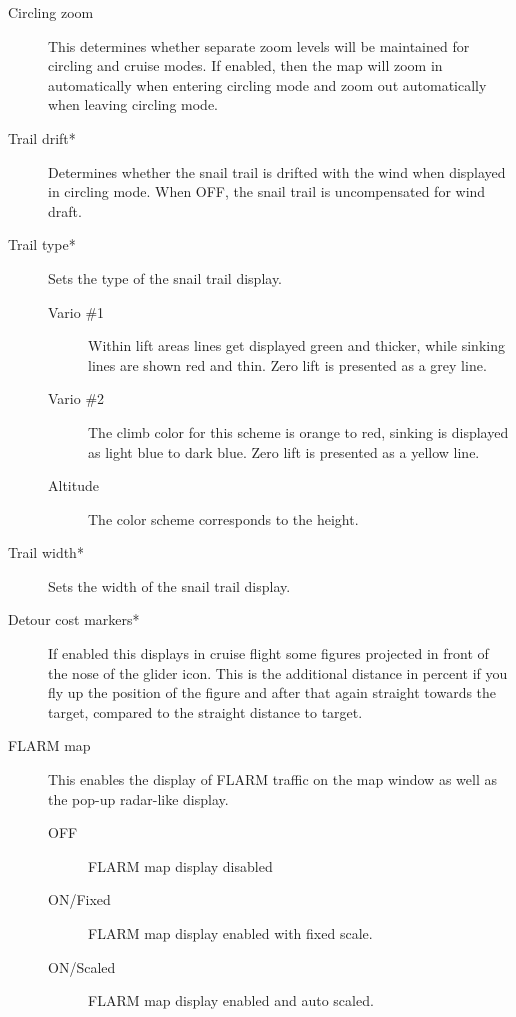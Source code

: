 \documentclass[a4paper,12pt]{refrep}
\begin{document}
\begin{description}
\item[Circling zoom] \label{conf:circlingzoom} This determines whether separate
zoom levels will be maintained for circling and cruise modes.  If enabled, then the 
map will zoom in automatically when entering circling mode and zoom out
automatically when leaving circling mode.

\item[Trail drift*] \label{conf:traildrift} Determines whether the
snail trail is drifted with the wind when displayed in circling mode.  When OFF,
the snail trail is uncompensated for wind draft.

\item[Trail type*] \label{conf:snailtype} Sets the type of the snail trail
display.
\begin{description}
\item[Vario \#1]  Within lift areas lines get displayed green and
thicker, while sinking lines are shown red and thin.  Zero lift
is presented as a grey line.
\item[Vario \#2]  The climb color for this scheme is orange to red, sinking is
displayed as light blue to dark blue. Zero lift
is presented as a yellow line.
\item[Altitude] The color scheme corresponds to the height.
\end{description}

\item[Trail width*] \label{conf:trailwidth} Sets the width of the snail trail
display.
\item[Detour cost markers*]  If enabled this displays in cruise flight some
figures projected in front of the nose of the glider icon.  This is the
additional distance in percent if you fly up the position of the figure and
after that again straight towards the target, compared to the straight distance
to target.
\item[FLARM map]  \label{conf:flarm-on-map}This enables the display of FLARM
traffic on the map window as well as the pop-up radar-like display.
\begin{description}
\item[OFF] FLARM map display disabled
\item[ON/Fixed] FLARM map display enabled with fixed scale.
\item[ON/Scaled] FLARM map display enabled and auto scaled.
\end{description}
	
\end{description}
\end{document}
